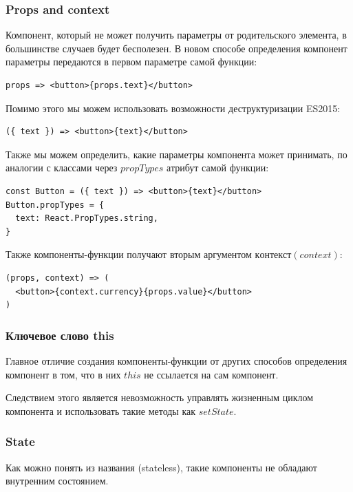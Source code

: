 \subsubsection{Props and context}

Компонент, который не может получить параметры от родительского элемента, в большинстве случаев будет бесполезен. В новом способе определения компонент параметры передаются в первом параметре самой функции:

\begin{lstlisting}
props => <button>{props.text}</button>
\end{lstlisting}

Помимо этого мы можем использовать возможности деструктуризации ES2015:

\begin{lstlisting}
({ text }) => <button>{text}</button>
\end{lstlisting}

Также мы можем определить, какие параметры компонента может принимать, по аналогии с классами через $propTypes$ атрибут самой функции:

\begin{lstlisting}
const Button = ({ text }) => <button>{text}</button>
Button.propTypes = {
  text: React.PropTypes.string,
}
\end{lstlisting}

Также компоненты-функции получают вторым аргументом $контекст (context)$:

\begin{lstlisting}
(props, context) => (
  <button>{context.currency}{props.value}</button>
)
\end{lstlisting}

\subsubsection{Ключевое слово this}

Главное отличие создания компоненты-функции от других способов определения компонент в том, что в них $this$ не ссылается на сам компонент.

Следствием этого является невозможность управлять жизненным циклом компонента и использовать такие методы как $setState$.

\subsubsection{State}

Как можно понять из названия (stateless), такие компоненты не обладают внутренним состоянием. 

